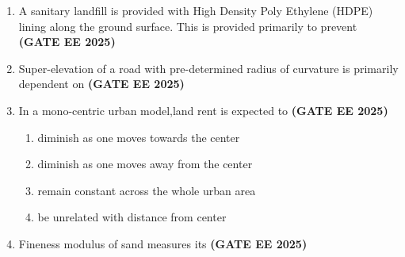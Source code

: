 \documentclass[journal,12pt,onecolumn]{IEEEtran}
\theoremstyle{remark}
\begin{document}
\begin{enumerate}
\begin{enumerate}
\end{enumerate}
\item A sanitary landfill is provided with High Density Poly Ethylene (HDPE) lining along the ground surface. This is provided primarily to prevent \hfill \textbf{(GATE EE 2025)}
\begin{enumerate}
\end{enumerate}
\item Super-elevation of a road with pre-determined radius of curvature is primarily dependent on \hfill \textbf{(GATE EE 2025)}
\begin{enumerate}
\end{enumerate}
\item In a mono-centric urban model,land rent is expected to \hfill \textbf{(GATE EE 2025)}
\begin{enumerate}
    \item diminish as one moves towards the center
    \item diminish as one moves away from the center
    \item remain constant across the whole urban area
    \item  be unrelated with distance from center
\end{enumerate}
\item Fineness modulus of sand measures its \hfill \textbf{(GATE EE 2025)}

\end{enumerate}
\end{document}
